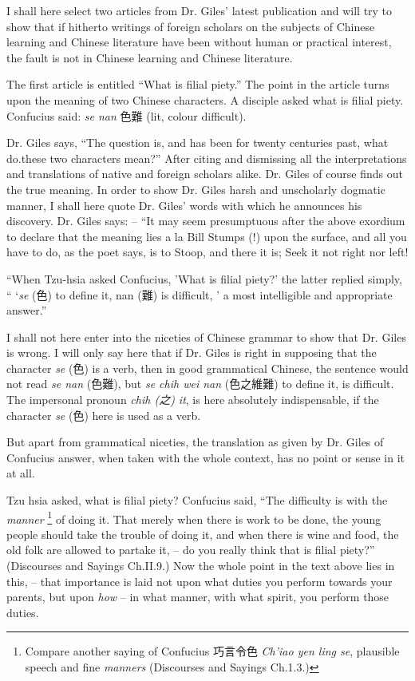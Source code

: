 I shall here select two articles from Dr. Giles' latest publication and will try to show
that if hitherto writings of foreign scholars on the subjects of Chinese learning
and Chinese literature have been without human or practical interest,
the fault is not in Chinese learning and Chinese literature.

The first article is entitled ``What is filial piety.''
The point in the article turns upon the meaning of two Chinese characters.
A disciple asked what is filial piety. Confucius said:
\emph{se nan} 色難  (lit, colour difficult).

Dr. Giles says, ``The question is, and has been for twenty centuries past,
what do.these two characters mean?''
After citing and dismissing all the interpretations and translations of native
and foreign scholars alike.
Dr. Giles of course finds out the true meaning.
In order to show Dr. Giles harsh and unscholarly dogmatic manner,
I shall here quote Dr. Giles' words with which he announces his discovery.
Dr. Giles says: -- 
``It may seem presumptuous after the above exordium to declare
that the meaning lies a la Bill Stumps (!) upon the surface,
and all you have to do, as the poet says, is to
Stoop, and there it is;
Seek it not right nor left!

``When Tzu-hsia asked Confucius, 'What is filial piety?' the latter replied simply,
`` `\emph{se} (色) to define it, nan (難) is difficult, ' a most intelligible and appropriate answer.''

I shall not here enter into the niceties of Chinese grammar to show
that Dr. Giles is wrong.
I will only say here that if Dr. Giles is right in supposing that the character \emph{se} (色) is a verb,
then in good grammatical Chinese, the sentence would not read \emph{se nan} (色難),
but \emph{se chih wei nan} (色之維難) to define it, is difficult.
The impersonal pronoun \emph{chih (之) it}, is here absolutely indispensable, if the character \emph{se} (色) here is used as a verb.

But apart from grammatical niceties,
the translation as given by Dr. Giles of Confucius answer,
when taken with the whole context, has no point or sense in it at all.

Tzu hsia asked, what is filial piety?
Confucius said, ``The difficulty is with the \emph{manner}
\footnote{Compare another saying of Confucius 巧言令色 \emph{Ch'iao yen ling se},
plausible speech and fine \emph{manners} (Discourses and Sayings Ch.1.3.)} of doing it.
That merely when there is work to be done,
the young people should take the trouble of doing it,
and when there is wine and food, the old folk are allowed to partake it,
-- do you really think that is filial piety?''
(Discourses and Sayings Ch.II.9.)
Now the whole point in the text above lies in this,
-- that importance is laid not upon what duties you perform towards your parents,
but upon \emph{how} -- in what manner, with what spirit, you perform those duties.


